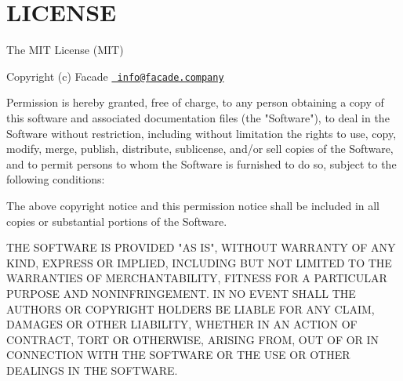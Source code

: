 \chapter{LICENSE}
\hypertarget{md_vendor_2spatie_2flare-client-php_2_l_i_c_e_n_s_e}{}\label{md_vendor_2spatie_2flare-client-php_2_l_i_c_e_n_s_e}
The MIT License (MIT)

Copyright (c) Facade \href{mailto:info@facade.company}{\texttt{ info@facade.\+company}}

Permission is hereby granted, free of charge, to any person obtaining a copy of this software and associated documentation files (the "{}\+Software"{}), to deal in the Software without restriction, including without limitation the rights to use, copy, modify, merge, publish, distribute, sublicense, and/or sell copies of the Software, and to permit persons to whom the Software is furnished to do so, subject to the following conditions\+:

The above copyright notice and this permission notice shall be included in all copies or substantial portions of the Software.

THE SOFTWARE IS PROVIDED "{}\+AS IS"{}, WITHOUT WARRANTY OF ANY KIND, EXPRESS OR IMPLIED, INCLUDING BUT NOT LIMITED TO THE WARRANTIES OF MERCHANTABILITY, FITNESS FOR A PARTICULAR PURPOSE AND NONINFRINGEMENT. IN NO EVENT SHALL THE AUTHORS OR COPYRIGHT HOLDERS BE LIABLE FOR ANY CLAIM, DAMAGES OR OTHER LIABILITY, WHETHER IN AN ACTION OF CONTRACT, TORT OR OTHERWISE, ARISING FROM, OUT OF OR IN CONNECTION WITH THE SOFTWARE OR THE USE OR OTHER DEALINGS IN THE SOFTWARE. 